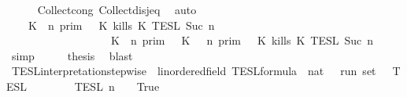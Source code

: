 \begin{isabellebody}
\ \ \ \ \isamarkupfalse%
\ Collect{\isacharunderscore}cong\ Collect{\isacharunderscore}disj{\isacharunderscore}eq\ \isamarkupfalse%
\ auto\isanewline
\ \ \isamarkupfalse%
\ \isamarkupfalse%
\ {\isacartoucheopen}{\isachardot}{\isachardot}{\isachardot}\ {\isacharequal}\ {\isasymlbrakk}\ K\ {\isasymnot}{\isasymUp}\ n\ {\isasymrbrakk}\isactrlsub p\isactrlsub r\isactrlsub i\isactrlsub m\ {\isasyminter}\ {\isasymlbrakk}\ K\ kills\ K\ {\isasymrbrakk}\isactrlsub T\isactrlsub E\isactrlsub S\isactrlsub L\isactrlbsup {\isasymge}\ Suc\ n\isactrlesup \isanewline
\ \ \ \ \ \ \ \ \ \ \ \ \ \ \ \ \ {\isasymunion}\ {\isasymlbrakk}\ K\ {\isasymUp}\ n\ {\isasymrbrakk}\isactrlsub p\isactrlsub r\isactrlsub i\isactrlsub m\ {\isasyminter}\ {\isasymlbrakk}\ K\ {\isasymnot}{\isasymUp}\ {\isasymge}\ n\ {\isasymrbrakk}\isactrlsub p\isactrlsub r\isactrlsub i\isactrlsub m\ {\isasyminter}\ {\isasymlbrakk}\ K\ kills\ K\ {\isasymrbrakk}\isactrlsub T\isactrlsub E\isactrlsub S\isactrlsub L\isactrlbsup {\isasymge}\ Suc\ n\isactrlesup {\isacartoucheclose}\ \isamarkupfalse%
\ simp\isanewline
\ \ \isamarkupfalse%
\ \isamarkupfalse%
\ {\isacharquery}thesis\ \isamarkupfalse%
\ blast\isanewline
{}\isamarkupfalse%
%
\endisatagproof
{\isafoldproof}%
%
\isadelimproof
\isanewline
%
\endisadelimproof
\isanewline
{}\isamarkupfalse%
\ TESL{\isacharunderscore}interpretation{\isacharunderscore}stepwise\ {\isacharcolon}{\isacharcolon}\ {\isacartoucheopen}{\isacharprime}{\isasymtau}{\isacharcolon}{\isacharcolon}linordered{\isacharunderscore}field\ TESL{\isacharunderscore}formula\ {\isasymRightarrow}\ nat\ {\isasymRightarrow}\ {\isacharprime}{\isasymtau}\ run\ set{\isacartoucheclose}\ {\isacharparenleft}{\isachardoublequoteopen}{\isasymlbrakk}{\isasymlbrakk}\ {\isacharunderscore}\ {\isasymrbrakk}{\isasymrbrakk}\isactrlsub T\isactrlsub E\isactrlsub S\isactrlsub L\isactrlbsup {\isasymge}\ {\isacharunderscore}\isactrlesup {\isachardoublequoteclose}{\isacharparenright}\ \isanewline
\ \ \ \ {\isacartoucheopen}{\isasymlbrakk}{\isasymlbrakk}\ {\isacharbrackleft}{\isacharbrackright}\ {\isasymrbrakk}{\isasymrbrakk}\isactrlsub T\isactrlsub E\isactrlsub S\isactrlsub L\isactrlbsup {\isasymge}\ n\isactrlesup \ {\isacharequal}\ {\isacharbraceleft}\ {\isacharunderscore}{\isachardot}\ True\ {\isacharbraceright}{\isacartoucheclose}\isanewline

\end{isabellebody}
